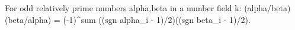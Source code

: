 For odd relatively prime numbers alpha,beta in a number field k: (alpha/beta)(beta/alpha) = (-1)^{sum ((sgn alpha_i - 1)/2)((sgn beta_i - 1)/2)}.
